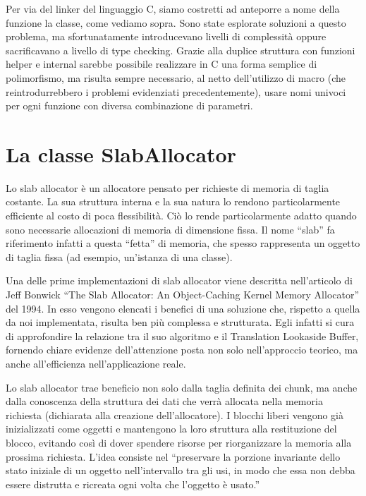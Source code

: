 Per via del linker del linguaggio C, siamo costretti ad anteporre a nome della funzione la classe, come vediamo sopra. Sono state esplorate soluzioni a questo problema, ma sfortunatamente introducevano livelli di complessità oppure sacrificavano a livello di type checking. Grazie alla duplice struttura con funzioni helper e internal sarebbe possibile realizzare in C una forma semplice di polimorfismo, ma risulta sempre necessario, al netto dell’utilizzo di macro (che reintrodurrebbero i problemi evidenziati precedentemente), usare nomi univoci per ogni funzione con diversa combinazione di parametri.

\section{La classe SlabAllocator}

Lo slab allocator è un allocatore pensato per richieste di memoria di taglia costante. La sua struttura interna e la sua natura lo rendono particolarmente efficiente al costo di poca flessibilità. Ciò lo rende particolarmente adatto quando sono necessarie allocazioni di memoria di dimensione fissa. Il nome ``slab'' fa riferimento infatti a questa ``fetta'' di memoria, che spesso rappresenta un oggetto di taglia fissa (ad esempio, un'istanza di una classe).

Una delle prime implementazioni di slab allocator viene descritta nell’articolo di Jeff Bonwick ``The Slab Allocator: An Object-Caching Kernel Memory Allocator'' del 1994. In esso vengono elencati i benefici di una soluzione che, rispetto a quella da noi implementata, risulta ben più complessa e strutturata. Egli infatti si cura di approfondire la relazione tra il suo algoritmo e il Translation Lookaside Buffer, fornendo chiare evidenze dell’attenzione posta non solo nell’approccio teorico, ma anche all’efficienza nell’applicazione reale.

Lo slab allocator trae beneficio non solo dalla taglia definita dei chunk, ma anche dalla conoscenza della struttura dei dati che verrà allocata nella memoria richiesta (dichiarata alla creazione dell’allocatore). I blocchi liberi vengono già inizializzati come oggetti e mantengono la loro struttura alla restituzione del blocco, evitando così di dover spendere risorse per riorganizzare la memoria alla prossima richiesta. L’idea consiste nel ``preservare la porzione invariante dello stato iniziale di un oggetto nell’intervallo tra gli usi, in modo che essa non debba essere distrutta e ricreata ogni volta che l’oggetto è usato.''

